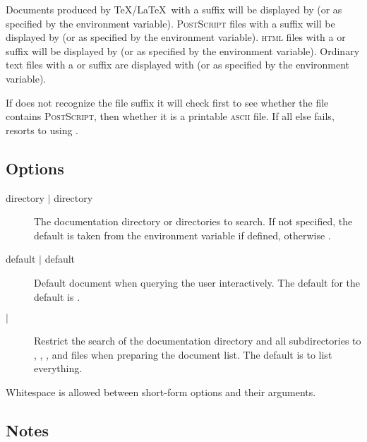 Documents produced by \TeX/\LaTeX\ with a  suffix will be displayed
by  (or as specified by the  environment
variable).  \textsc{PostScript} files with a  suffix will be
displayed by  (or as specified by the 
environment variable).  \textsc{html} files with a  or 
suffix will be displayed by  (or as specified by the
 environment variable).  Ordinary text files with a
 or  suffix are displayed with  (or as
specified by the  environment variable).

If  does not recognize the file suffix it will check first to see
whether the file contains \textsc{PostScript}, then whether it is a printable
\textsc{ascii} file.  If all else fails,  resorts to using
.

\subsection*{Options}

\begin{description}
\item[ directory $\mid$ directory]
   The documentation directory or directories to search.  If not specified,
   the default is taken from the  environment variable if
   defined, otherwise .

\item[ default $\mid$ default]
   Default document when querying the user interactively.  The default for the
   default is .

\item[ $\mid$ ]
   Restrict the search of the documentation directory and all subdirectories
   to , , , and  files when
   preparing the document list.  The default is to list everything.
\end{description}

\noindent
Whitespace is allowed between short-form options and their arguments.

\subsection*{Notes}


